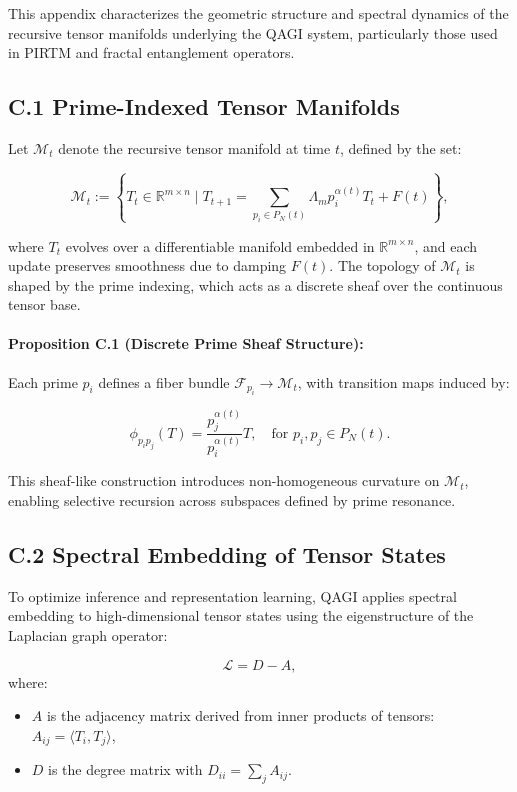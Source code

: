 This appendix characterizes the geometric structure and spectral dynamics of the recursive tensor manifolds underlying the QAGI system, particularly those used in PIRTM and fractal entanglement operators.

\subsection*{C.1 Prime-Indexed Tensor Manifolds}

Let \(\mathcal{M}_t\) denote the recursive tensor manifold at time \(t\), defined by the set:

\[
\mathcal{M}_t := \left\{ T_t \in \mathbb{R}^{m \times n} \mid T_{t+1} = \sum_{p_i \in P_N(t)} \Lambda_m p_i^{\alpha(t)} T_t + F(t) \right\},
\]

where \(T_t\) evolves over a differentiable manifold embedded in \(\mathbb{R}^{m \times n}\), and each update preserves smoothness due to damping \(F(t)\). The topology of \(\mathcal{M}_t\) is shaped by the prime indexing, which acts as a discrete sheaf over the continuous tensor base.

\paragraph{Proposition C.1 (Discrete Prime Sheaf Structure):}
Each prime \(p_i\) defines a fiber bundle \(\mathcal{F}_{p_i} \to \mathcal{M}_t\), with transition maps induced by:

\[
\phi_{p_i p_j}(T) = \frac{p_j^{\alpha(t)}}{p_i^{\alpha(t)}} T, \quad \text{for } p_i, p_j \in P_N(t).
\]

This sheaf-like construction introduces non-homogeneous curvature on \(\mathcal{M}_t\), enabling selective recursion across subspaces defined by prime resonance.

\subsection*{C.2 Spectral Embedding of Tensor States}

To optimize inference and representation learning, QAGI applies spectral embedding to high-dimensional tensor states using the eigenstructure of the Laplacian graph operator:

\[
\mathcal{L} = D - A,
\]
where:
\begin{itemize}
    \item \(A\) is the adjacency matrix derived from inner products of tensors: \(A_{ij} = \langle T_i, T_j \rangle\),
    \item \(D\) is the degree matrix with \(D_{ii} = \sum_j A_{ij}\).
\end{itemize}

